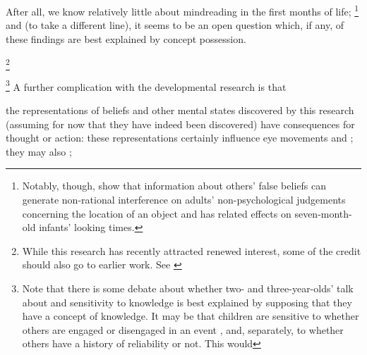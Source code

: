 \documentclass[11pt,a4paper]{extarticle}
\begin{document}
After all, we know relatively little about mindreading in the first months of life;%
\footnote{
Notably, though, \citet{kovacs_social_2010} show that information about others' false beliefs can generate non-rational interference on adults' non-psychological judgements concerning the location of an object and has related effects on seven-month-old infants' looking times.
}
 and (to take a different line), it seems to be an open question which, if any, of these findings are best explained by concept possession.


 
\footnote{
While this research has recently attracted renewed interest, some of the credit should also go to earlier work. 
See \citet{Clements:1994cw,Garnham:2001jm,Garnham:2001ql,Ruffman:2001ng}
}


%
\footnote{
Note that there is some debate about whether two- and three-year-olds' talk about and sensitivity to knowledge is best explained by supposing that they have a concept of knowledge.
It may be that children are sensitive to whether others are engaged or disengaged in an event \citep{ONeill:1996um}, and, separately, to whether others have a history of reliability or not.
This would 

} 
A further complication with the developmental research is that 


 
 

the representations of beliefs and other mental states discovered by this research (assuming for now that they have indeed been discovered) have consequences for thought or action:
these representations certainly influence eye movements \citep{Clements:1994cw} and  \citep{kovacs_social_2010}; they may also ; 
\end{document}
